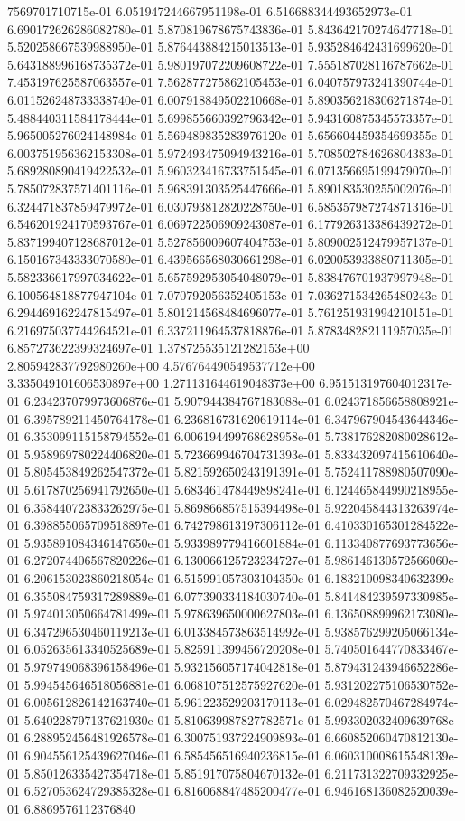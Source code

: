 7569701710715e-01	6.051947244667951198e-01	6.516688344493652973e-01	6.690172626286082780e-01	5.870819678675743836e-01	5.843642170274647718e-01	5.520258667539988950e-01	5.876443884215013513e-01	5.935284642431699620e-01	5.643188996168735372e-01	5.980197072209608722e-01	7.555187028116787662e-01	7.453197625587063557e-01	7.562877275862105453e-01	6.040757973241390744e-01	6.011526248733338740e-01	6.007918849502210668e-01	5.890356218306271874e-01	5.488440311584178444e-01	5.699855660392796342e-01	5.943160875345573357e-01	5.965005276024148984e-01	5.569489835283976120e-01	5.656604459354699355e-01	6.003751956362153308e-01	5.972493475094943216e-01	5.708502784626804383e-01	5.689280890419422532e-01	5.960323416733751545e-01	6.071356695199479070e-01	5.785072837571401116e-01	5.968391303525447666e-01	5.890183530255002076e-01	6.324471837859479972e-01	6.030793812820228750e-01	6.585357987274871316e-01	6.546201924170593767e-01	6.069722506909243087e-01	6.177926313386439272e-01	5.837199407128687012e-01	5.527856009607404753e-01	5.809002512479957137e-01	6.150167343333070580e-01	6.439566568030661298e-01	6.020053933880711305e-01	5.582336617997034622e-01	5.657592953054048079e-01	5.838476701937997948e-01	6.100564818877947104e-01	7.070792056352405153e-01	7.036271534265480243e-01	6.294469162247815497e-01	5.801214568484696077e-01	5.761251931994210151e-01	6.216975037744264521e-01	6.337211964537818876e-01	5.878348282111957035e-01	6.857273622399324697e-01	1.378725535121282153e+00	2.805942837792980260e+00	4.576764490549537712e+00	3.335049101606530897e+00	1.271131644619048373e+00	6.951513197604012317e-01	6.234237079973606876e-01	5.907944384767183088e-01	6.024371856658808921e-01	6.395789211450764178e-01	6.236816731620619114e-01	6.347967904543644346e-01	6.353099115158794552e-01	6.006194499768628958e-01	5.738176282080028612e-01	5.958969780224406820e-01	5.723669946704731393e-01	5.833432097415610640e-01	5.805453849262547372e-01	5.821592650243191391e-01	5.752411788980507090e-01	5.617870256941792650e-01	5.683461478449898241e-01	6.124465844990218955e-01	6.358440723833262975e-01	5.869866857515394498e-01	5.922045844313263974e-01	6.398855065709518897e-01	6.742798613197306112e-01	6.410330165301284522e-01	5.935891084346147650e-01	5.933989779416601884e-01	6.113340877693773656e-01	6.272074406567820226e-01	6.130066125723234727e-01	5.986146130572566060e-01	6.206153023860218054e-01	6.515991057303104350e-01	6.183210098340632399e-01	6.355084759317289889e-01	6.077390334184030740e-01	5.841484239597330985e-01	5.974013050664781499e-01	5.978639650000627803e-01	6.136508899962173080e-01	6.347296530460119213e-01	6.013384573863514992e-01	5.938576299205066134e-01	6.052635613340525689e-01	5.825911399456720208e-01	5.740501644770833467e-01	5.979749068396158496e-01	5.932156057174042818e-01	5.879431243946652286e-01	5.994545646518056881e-01	6.068107512575927620e-01	5.931202275106530752e-01	6.005612826142163740e-01	5.961223529203170113e-01	6.029482570467284974e-01	5.640228797137621930e-01	5.810639987827782571e-01	5.993302032409639768e-01	6.288952456481926578e-01	6.300751937224909893e-01	6.660852060470812130e-01	6.904556125439627046e-01	6.585456516940236815e-01	6.060310008615548139e-01	5.850126335427354718e-01	5.851917075804670132e-01	6.211731322709332925e-01	6.527053624729385328e-01	6.816068847485200477e-01	6.946168136082520039e-01	6.8869576112376840